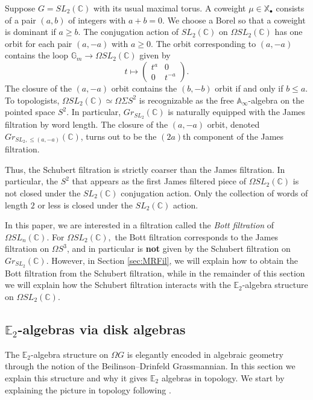 \begin{exm} \label{sl2example}
Suppose $G=SL_2(\mathbb{C})$ with its usual maximal torus.  A coweight $\mu \in \mathbb{X}_\bullet$ consists of a pair $(a,b)$ of integers with $a+b=0$.  We choose a Borel so that a coweight is dominant if $a \ge b$.  The conjugation action of $SL_2(\mathbb{C})$ on $\Omega SL_2(\mathbb{C})$ has one orbit for each pair $(a,-a)$ with $a \ge 0$.  The orbit corresponding to $(a,-a)$ contains the loop $\mathbb{G}_m \rightarrow \Omega SL_2(\mathbb{C})$ given by
$$
t \mapsto \left( \begin{array}{cc} t^a & 0 \\ 0 & t^{-a}  \end{array} \right).
$$
The closure of the $(a,-a)$ orbit contains the $(b,-b)$ orbit if and only if $b \le a$.  To topologists, $\Omega SL_2(\mathbb{C}) \simeq \Omega \Sigma S^2$ is recognizable as the free $\mathbb{A}_\infty$-algebra on the pointed space $S^2$.  In particular, $Gr_{SL_2}(\mathbb{C})$ is naturally equipped with the James filtration by word length.  The closure of the $(a,-a)$ orbit, denoted $Gr_{SL_2,\le (a,-a)}(\mathbb{C})$, turns out to be the $(2a)$th component of the James filtration.

Thus, the Schubert filtration is strictly coarser than the James filtration.  In particular, the $S^2$ that appears as the first James filtered piece of $\Omega SL_2(\mathbb{C})$ is not closed under the $SL_2(\mathbb{C})$ conjugation action.  Only the collection of words of length $2$ or less is closed under the $SL_2(\mathbb{C})$ action.

In this paper, we are interested in a filtration called the \emph{Bott filtration} of $\Omega SL_n(\mathbb{C}).$  For $\Omega SL_2(\mathbb{C}),$ the Bott filtration corresponds to the James filtration on $\Omega S^3$, and in particular is \textbf{not} given by the Schubert filtration on $Gr_{SL_2}(\mathbb{C})$.  However, in Section \ref{sec:MRFil}, we will explain how to obtain the Bott filtration from the Schubert filtration, while in the remainder of this section we will explain how the Schubert filtration interacts with the $\mathbb{E}_2$-algebra structure on $\Omega SL_2(\mathbb{C})$.
\end{exm}

\subsection{$\mathbb{E}_2$-algebras via disk algebras}

The $\mathbb{E}_2$-algebra structure on $\Omega G$ is elegantly encoded in algebraic geometry through the notion of the Beilinson--Drinfeld Grassmannian.  In this section we explain this structure and why it gives $\mathbb{E}_2$ algebras in topology.  We start by explaining the picture in topology following \cite[\S 5.5]{HA}.

